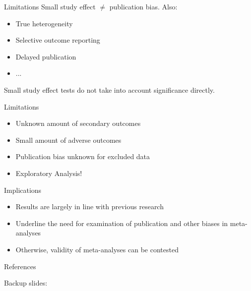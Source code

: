 \documentclass[english]{beamer}\usepackage[]{graphicx}\usepackage[]{color}
\begin{document}
\begin{frame}{Limitations}
Small study effect $\neq$ publication bias. Also:
\begin{itemize}
\item True heterogeneity
\item Selective outcome reporting
\item Delayed publication
\item ...
\end{itemize}
\vspace{-3mm}
Small study effect tests do not take into account significance directly.
\end{frame}

\begin{frame}{Limitations}
\begin{itemize}
\item Unknown amount of secondary outcomes
\item Small amount of adverse outcomes
\item Publication bias unknown for excluded data
\item Exploratory Analysis!
\end{itemize}
\end{frame}

\begin{frame}{Implications}
\begin{itemize}
\item Results are largely in line with previous research
\item Underline the need for examination of publication and other biases in meta-analyses
\item Otherwise, validity of meta-analyses can be contested
\end{itemize}
\end{frame}


\begin{frame}{References}
  \small
  

\end{frame}


\begin{frame}
Backup slides:
\end{frame}
\end{document}
